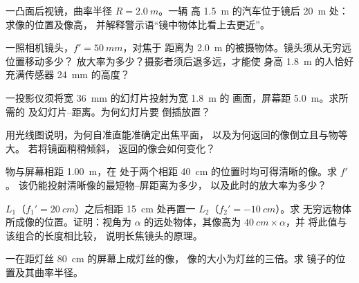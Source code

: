 \begin{exercise}[$\star\star$]\label{exo:b1:mirrors-thin-lenses:5}
一凸面后视镜，曲率半径 $R = \qty{2.0}{m}$。一辆
高 \qty{1.5}{m} 的汽车位于镜后 \qty{20}{m} 处：求像的位置及像高，
并解释警示语“镜中物体比看上去更近”。
\end{exercise}

\begin{exercise}[$\star\star$]\label{exo:b1:mirrors-thin-lenses:6}
一照相机镜头，$f' = \qty{50}{mm}$，对焦于
距离为 \qty{2.0}{m} 的被摄物体。镜头须从无穷远位置移动多少？
放大率为多少？摄影者须后退多远，才能使
身高 \qty{1.8}{m} 的人恰好充满传感器 \qty{24}{mm} 的高度？
\end{exercise}

\begin{exercise}[$\star\star$]\label{exo:b1:mirrors-thin-lenses:7}
一投影仪须将宽 \qty{36}{mm} 的幻灯片投射为宽 \qty{1.8}{m} 的
画面，屏幕距 \qty{5.0}{m}。求所需的
及幻灯片–距离。为何幻灯片要
倒插放置？
\end{exercise}

\begin{exercise}[$\star\star$]\label{exo:b1:mirrors-thin-lenses:8}
用光线图说明，为何自准直能准确定出焦平面，
以及为何返回的像倒立且与物等大。
若将镜面稍稍倾斜，
返回的像会如何变化？
\end{exercise}

\begin{exercise}[$\star\star$]\label{exo:b1:mirrors-thin-lenses:9}
物与屏幕相距 \qty{1.00}{m}，在
处于两个相距 \qty{40}{cm} 的位置时均可得清晰的像。求 $f'$。
该仍能投射清晰像的最短物–屏距离为多少，
以及此时的放大率为多少？
\end{exercise}

\begin{exercise}[$\star\star\star$]\label{exo:b1:mirrors-thin-lenses:10}
 $L_1$（$f_1' = \qty{20}{cm}$）之后相距 \qty{15}{cm}
处再置一 $L_2$（$f_2' = \qty{-10}{cm}$）。求
无穷远物体所成像的位置。证明：视角为
$\alpha$ 的远处物体，其像高为 $\qty{40}{cm}\times\alpha$，并
将此值与该组合的长度相比较，
说明长焦镜头的原理。
\end{exercise}

\begin{exercise}[$\star\star\star$]\label{exo:b1:mirrors-thin-lenses:11}
一在距灯丝 \qty{80}{cm} 的屏幕上成灯丝的像，
像的大小为灯丝的三倍。求
镜子的位置及其曲率半径。
\end{exercise}

